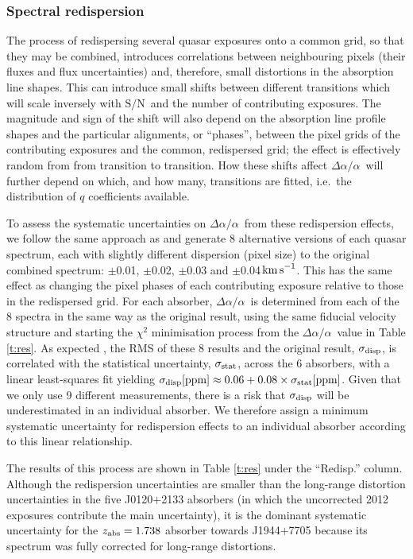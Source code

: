 \documentclass[fleqn,usenatbib,usedcolumn]{mnras}
\newcommand{\Tref}[1]{Table \ref{#1}}
\newcommand{\kms}{\ensuremath{\textrm{km\,s}^{-1}}}
\newcommand{\SN}{\ensuremath{\textrm{S/N}}}
\newcommand{\zab}{\ensuremath{z_\textrm{\scriptsize abs}}}
\newcommand{\daa}{\ensuremath{\Delta\alpha/\alpha}}
\begin{document}
\subsubsection{Spectral redispersion}\label{sss:redisp}

The process of redispersing several quasar exposures onto a common grid, so that they may be combined, introduces correlations between neighbouring pixels (their fluxes and flux uncertainties) and, therefore, small distortions in the absorption line shapes. This can introduce small shifts between different transitions which will scale inversely with \SN\ and the number of contributing exposures. The magnitude and sign of the shift will also depend on the absorption line profile shapes and the particular alignments, or ``phases'', between the pixel grids of the contributing exposures and the common, redispersed grid; the effect is effectively random from from transition to transition. How these shifts affect \daa\ will further depend on which, and how many, transitions are fitted, i.e.\ the distribution of $q$ coefficients available.

To assess the systematic uncertainties on \daa\ from these redispersion effects, we follow the same approach as \citet{Murphy:2016:2461} and generate 8 alternative versions of each quasar spectrum, each with slightly different dispersion (pixel size) to the original combined spectrum: $\pm$0.01, $\pm$0.02, $\pm$0.03 and $\pm$0.04\,\kms. This has the same effect as changing the pixel phases of each contributing exposure relative to those in the redispersed grid. For each absorber, \daa\ is determined from each of the 8 spectra in the same way as the original result, using the same fiducial velocity structure and starting the $\chi^2$ minimisation process from the \daa\ value in \Tref{t:res}. As expected \citep[and found by ][]{Murphy:2016:2461}, the RMS of these 8 results and the original result, $\sigma_{\rm disp}$, is correlated with the statistical uncertainty, $\sigma_{\rm stat}$, across the 6 absorbers, with a linear least-squares fit yielding $\sigma_{\rm disp}[{\rm ppm}]\approx 0.06 + 0.08 \times \sigma_{\rm stat}[{\rm ppm}]$. Given that we only use 9 different measurements, there is a risk that $\sigma_{\rm disp}$ will be underestimated in an individual absorber. We therefore assign a minimum systematic uncertainty for redispersion effects to an individual absorber according to this linear relationship.

The results of this process are shown in \Tref{t:res} under the ``Redisp.'' column. Although the redispersion uncertainties are smaller than the long-range distortion uncertainties in the five J0120$+$2133 absorbers (in which the uncorrected 2012 exposures contribute the main uncertainty), it is the dominant systematic uncertainty for the $\zab=1.738$ absorber towards J1944$+$7705 because its spectrum was fully corrected for long-range distortions.
\end{document}
